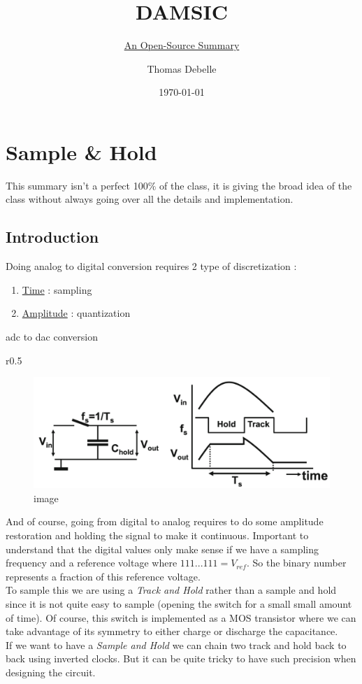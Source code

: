 \documentclass[
  a4paper,
]{article}
\title{DAMSIC}
\subtitle{\href{https://github.com/Tfloow/Q8_KUL}{An Open-Source
Summary}}
\author{Thomas Debelle}
\date{\today}
\begin{document}
\maketitle

{
\setcounter{tocdepth}{3}
\tableofcontents
}
\hypertarget{sample-hold}{%
\section{Sample \& Hold}\label{sample-hold}}

This summary isn't a perfect 100\(\%\) of the class, it is giving the
broad idea of the class without always going over all the details and
implementation.

\hypertarget{introduction}{%
\subsection{Introduction}\label{introduction}}

Doing analog to digital conversion requires 2 type of discretization :

\begin{enumerate}
\def\labelenumi{\arabic{enumi}.}
\item
  \ul{Time} : sampling
\item
  \ul{Amplitude} : quantization
\end{enumerate}

{adc} to {dac} conversion

r0.5

\begin{figure}
\centering
\includegraphics{img/th.png}
\caption{image}
\end{figure}

And of course, going from digital to analog requires to do some
amplitude restoration and holding the signal to make it continuous.
Important to understand that the digital values only make sense if we
have a sampling frequency and a reference voltage where
\(111...111 = V_{ref}\). So the binary number represents a fraction of
this reference voltage.\\
To sample this we are using a \emph{Track and Hold} rather than a sample
and hold since it is not quite easy to sample (opening the switch for a
small small amount of time). Of course, this switch is implemented as a
MOS transistor where we can take advantage of its symmetry to either
charge or discharge the capacitance.\\
If we want to have a \emph{Sample and Hold} we can chain two track and
hold back to back using inverted clocks. But it can be quite tricky to
have such precision when designing the circuit.
\end{document}
